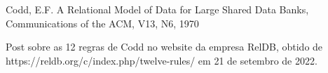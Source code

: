 \documentclass[
12pt,		%
openright,	%
twoside,  %
a4paper,			%
chapter=TITLE,		%
english,			%
french,				%
spanish,			%
brazil				%
]{USPSC-classe/USPSC_RedarTex}
\begin{document}
\begin{flushleft}
\begin{flushleft}
\begin{flushleft}
\begin{flushleft}
\begin{flushleft}
\begin{flushleft}
\begin{flushleft}
\begin{flushleft}
\begin{flushleft}
\begin{flushleft}
[CODD, 1970] Codd, E.F. A Relational Model of Data for Large Shared Data Banks, Communications of the ACM, V13, N6, 1970
\end{flushleft}


\end{flushleft}


\end{flushleft}


\end{flushleft}


\end{flushleft}


\end{flushleft}


\end{flushleft}


\end{flushleft}


\end{flushleft}


\end{flushleft}


\begin{flushleft}
\begin{flushleft}
\begin{flushleft}
\begin{flushleft}
\begin{flushleft}
\begin{flushleft}
\begin{flushleft}
\begin{flushleft}
\begin{flushleft}
\begin{flushleft}
[RelDB, 2019] Post sobre as 12 regras de Codd no website da empresa RelDB, obtido de https://reldb.org/c/index.php/twelve-rules/ em 21 de setembro de 2022.
\end{flushleft}


\end{flushleft}


\end{flushleft}


\end{flushleft}


\end{flushleft}


\end{flushleft}


\end{flushleft}


\end{flushleft}


\end{flushleft}


\end{flushleft}
\end{document}
